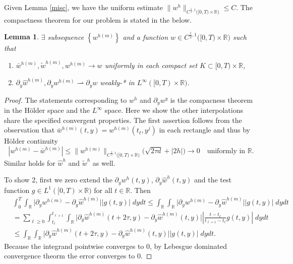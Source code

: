 \documentclass[a4paper,11pt]{article}
\newtheorem{lemma}{Lemma}[section]
\theoremstyle{remark}
\begin{document}
Given Lemma \ref{misc}, we have the uniform estimate $\| w^h\|_{C^{\frac{1}{2},1}\big([0,T)\times \mathbb{R}\big)} \le C$. The compactness theorem for our problem is stated in the below.

\begin{lemma}\label{compactness}
 $\exists$ subsequence $\left\{w^{h(m)}\right\}$ and a function $w\in C^{\frac{1}{2},1}\big([0,T)\times \mathbb{R}\big)$ such that 
 \begin{enumerate}
  \item $\bar{w}^{h(m)},\tilde{w}^{h(m)}, w^{h(m)}\rightarrow w$ uniformly in each compact set $K \subset [0,T)\times \mathbb{R}$,
  \item $\partial_y \hat{w}^{h(m)}, \partial_y w^{h(m)} \rightharpoonup \partial_y w$ weakly-* in $L^\infty([0,T)\times \mathbb{R})$.
 \end{enumerate}
\end{lemma}
\begin{proof}
The statements corresponding to $w^h$ and $\partial_y w^y$ is the compacness theorem in the H\"older space and the $L^\infty$ space.
 Here we show the other interpolations share the specified convergent properties. The first assertion follows from the observation that $\bar{w}^{h(m)}(t,y) = w^{h(m)}(t_\ell, y^j)$ in each rectangle and thus by H\"older continuity
 $$|w^{h(m)} - \bar{w}^{h(m)}| \le \|w^{h(m)}\|_{C^{\frac{1}{2},1}\big([0,T)\times \mathbb{R}\big)}\Big(\sqrt{2\tau d} + |2h|\Big) \rightarrow 0 \quad \text{uniformly in $\mathbb{R}$}.$$
 Similar holds for $\hat{w}^h$ and $\tilde{w}^h$ as well.
 
 To show 2, first we zero extend the $\partial_y {w}^h(t,y)$, $\partial_y \hat{w}^h(t,y)$ and the test function $g\in L^1([0,T)\times \mathbb{R})$ for all $t\in \mathbb{R}$. Then
 \begin{align*}
  &\int_0^T\int_\mathbb{R} \Big|\partial_y {w}^{h(m)} - \partial_y \hat{w}^{h(m)}\Big| \Big|g(t,y)\Big| \; dydt \le \int_\mathbb{R}\int_\mathbb{R} \Big|\partial_y {w}^{h(m)} - \partial_y \hat{w}^{h(m)}\Big| \Big|g(t,y)\Big| \; dydt\\
  &= \sum_{\ell\ge0}\int_{t_\ell}^{t_{\ell+1}}\int_\mathbb{R} \Big|\partial_y \hat{w}^{h(m)}(t+2\tau,y)-\partial_y \hat{w}^{h(m)}(t,y) \Big| \left|\frac{t-t_\ell}{t_{\ell+1}-t_{\ell}}g(t,y) \right|\;dydt\\
  &\le \int_\mathbb{R} \int_\mathbb{R} \Big|\partial_y \hat{w}^{h(m)}(t+2\tau,y)-\partial_y \hat{w}^{h(m)}(t,y) \Big| \Big|g(t,y)\Big| \; dydt.
 \end{align*}
 Because the integrand pointwise converges to $0$, by Lebesgue dominated convergence theorm the error converges to $0$.
\end{proof}
\end{document}
